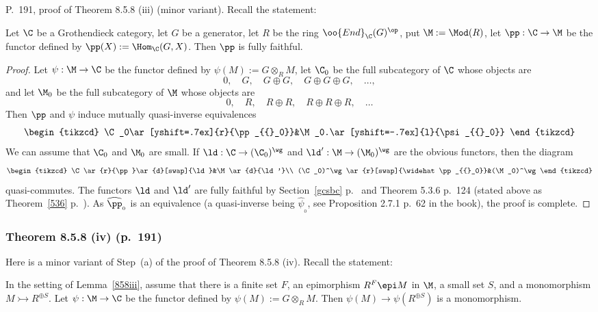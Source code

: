 \documentclass[12pt]{article}
\theoremstyle{remark}
\theoremstyle{definition}
\begin{document}
\begin{s} P.~191, proof of Theorem 8.5.8 (iii) (minor variant). Recall the statement: 

\begin{lem}
Let $\C$ be a Grothendieck category, let $G$ be a generator, let $R$ be the ring $\oo{End}_\C(G)^{\op}$, put $\M:=\Mod(R)$, let $\pp:\C\to\M$ be the functor defined by $\pp(X):=\Hom_\C(G,X)$. Then $\pp$ is fully faithful. 
\end{lem}

\begin{proof}
Let $\psi:\M\to\C$ be the functor defined by $\psi(M):=G\otimes_RM$, let $\C_0$ be the full subcategory of $\C$ whose objects are 
$$
0,\quad G,\quad G\oplus G,\quad G\oplus G\oplus G,\quad\dots,
$$
and let $\M_0$ be the full subcategory of $\M$ whose objects are 
$$
0,\quad R,\quad R\oplus R,\quad R\oplus R\oplus R,\quad\dots
$$
Then $\pp$ and $\psi$ induce mutually quasi-inverse equivalences 
$$
\begin{tikzcd}
\C_0\ar[yshift=.7ex]{r}{\pp_{{}_0}}&\M_0.\ar[yshift=-.7ex]{l}{\psi_{{}_0}}
\end{tikzcd}
$$ 
We can assume that $\C_0$ and $\M_0$ are small. If $\ld:\C\to(\C_0)^\wg$ and $\ld':\M\to(\M_0)^\wg$ are the obvious functors, then the diagram 
$$
\begin{tikzcd}
\C\ar{r}{\pp}\ar{d}[swap]{\ld}&\M\ar{d}{\ld'}\\
(\C_0)^\wg\ar{r}[swap]{\widehat\pp_{{}_0}}&(\M_0)^\wg
\end{tikzcd}
$$ 
quasi-commutes. The functors $\ld$ and $\ld'$ are fully faithful by Section~\ref{gcsbc} p.~ and Theorem 5.3.6 p.~124 (stated above as Theorem~\ref{536} p.~). As $\widehat\pp_{{}_0}$ is an equivalence (a quasi-inverse being $\widehat\psi_{{}_0}$, see Proposition 2.7.1 p.~62 in the book), the proof is complete.
\end{proof}
\end{s}


\subsubsection{Theorem 8.5.8 (iv) (p.~191)} 

Here is a minor variant of Step~(a) of the proof of Theorem 8.5.8 (iv). Recall the statement: 

\begin{lem}
In the setting of Lemma~\ref{858iii}, assume that there is a finite set $F$, an epimorphism $R^F\epi M$ in $\M$, a small set $S$, and a monomorphism $M\rightarrowtail R^{\oplus S}$. Let $\psi:\M\to\C$ be the functor defined by $\psi(M):=G\otimes_RM$. Then $\psi(M)\to\psi(R^{\oplus S})$ is a monomorphism. 
\end{lem}
\end{document}
